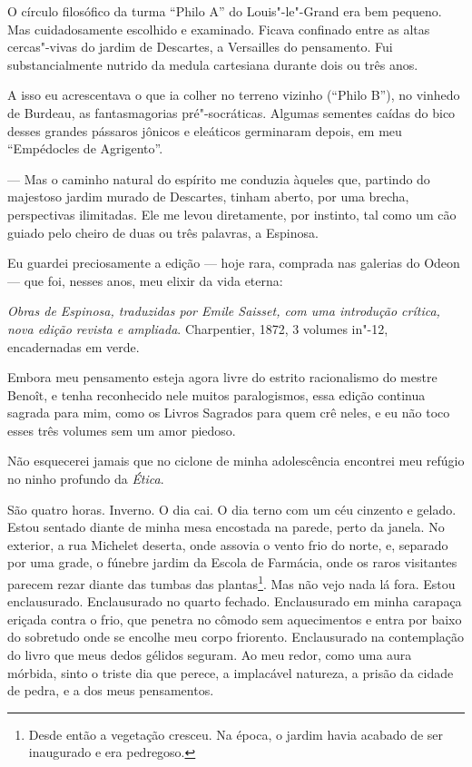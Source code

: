 O círculo filosófico da turma ``Philo A'' do Louis"-le"-Grand era bem
pequeno. Mas cuidadosamente escolhido e examinado. Ficava confinado
entre as altas cercas"-vivas do jardim de Descartes, a Versailles do
pensamento. Fui substancialmente nutrido da medula cartesiana durante
dois ou três anos.

A isso eu acrescentava o que ia colher no terreno
vizinho (``Philo B''), no vinhedo de Burdeau, as fantasmagorias
pré"-socráticas. Algumas sementes caídas do bico desses grandes pássaros
jônicos e eleáticos germinaram depois, em meu ``Empédocles de
Agrigento''.

--- Mas o caminho natural do espírito me conduzia àqueles
que, partindo do majestoso jardim murado de Descartes, tinham aberto,
por uma brecha, perspectivas ilimitadas. Ele me levou diretamente, por
instinto, tal como um cão guiado pelo cheiro de duas ou três palavras, a
Espinosa.

Eu guardei preciosamente a edição --- hoje rara, comprada nas galerias do
Odeon --- que foi, nesses anos, meu elixir da vida eterna:

\emph{Obras de
Espinosa, traduzidas por Emile Saisset, com uma introdução crítica, nova
edição revista e ampliada}. Charpentier, 1872, 3 volumes in"-12,
encadernadas em verde.

Embora meu pensamento esteja agora livre do estrito racionalismo do
mestre Benoît, e tenha reconhecido nele muitos paralogismos, essa edição
continua sagrada para mim, como os Livros Sagrados para quem crê neles,
e eu não toco esses três volumes sem um amor piedoso.

Não esquecerei jamais que no ciclone de minha adolescência encontrei meu
refúgio no ninho profundo da \emph{Ética}.

São quatro horas. Inverno. O dia cai. O dia terno com um céu cinzento e
gelado. Estou sentado diante de minha mesa encostada na parede, perto da
janela. No exterior, a rua Michelet deserta, onde assovia o vento frio
do norte, e, separado por uma grade, o fúnebre jardim da Escola de
Farmácia, onde os raros visitantes parecem rezar diante das tumbas das
plantas\footnote{Desde então a vegetação cresceu. Na época, o jardim
  havia acabado de ser inaugurado e era pedregoso.}. Mas não vejo nada
lá fora. Estou enclausurado. Enclausurado no quarto fechado.
Enclausurado em minha carapaça eriçada contra o frio, que penetra no
cômodo sem aquecimentos e entra por baixo do sobretudo onde se encolhe
meu corpo friorento. Enclausurado na contemplação do livro que meus
dedos gélidos seguram. Ao meu redor, como uma aura mórbida, sinto o
triste dia que perece, a implacável natureza, a prisão da cidade de
pedra, e a dos meus pensamentos.

